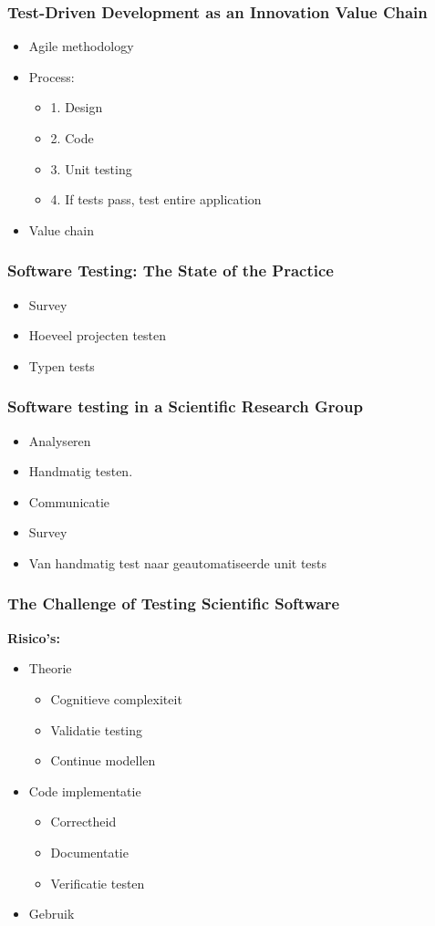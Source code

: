 \documentclass[10pt]{beamer}
\begin{document}
	\begin{frame}
		\frametitle{Test-Driven Development as an Innovation Value Chain}
		\begin{itemize}
			\item Agile methodology
			\item Process:
				\begin{itemize}
					\item 1. Design
					\item 2. Code
					\item 3. Unit testing
					\item 4. If tests pass, test entire application
				\end{itemize}
			\item Value chain
		\end{itemize}
	\end{frame}

	\begin{frame}
		\frametitle{Software Testing: The State of the Practice}
		\begin{itemize}
			\item Survey
			\item Hoeveel projecten testen
			\item Typen tests
		\end{itemize}
	\end{frame}	

	\begin{frame}
		\frametitle{Software testing in a Scientific Research Group}
		\begin{itemize}
			\item Analyseren 
			\item Handmatig testen.
			\item Communicatie
			\item Survey
			\item Van handmatig test naar geautomatiseerde unit tests
		\end{itemize} 
	\end{frame}

	\begin{frame}
		\frametitle{The Challenge of Testing Scientific Software}
		\textbf{Risico's:}
		\begin{itemize}
			\item Theorie
			\begin{itemize}
				\item Cognitieve complexiteit
				\item Validatie testing
				\item Continue modellen
			\end{itemize}
			\item Code implementatie
			\begin{itemize}
				\item Correctheid
				\item Documentatie
				\item Verificatie testen
			\end{itemize}
			\item Gebruik
		\end{itemize}
	\end{frame}
\end{document}
